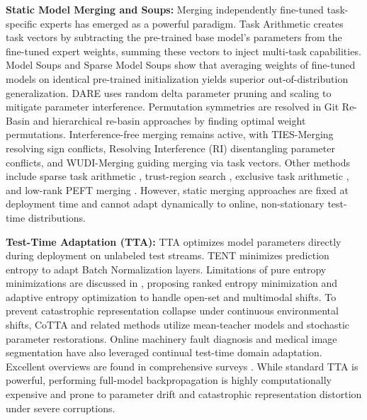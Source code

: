 \documentclass{article}
\theoremstyle{plain}
\theoremstyle{definition}
\theoremstyle{remark}
\begin{document}
\textbf{Static Model Merging and Soups:} Merging independently fine-tuned task-specific experts has emerged as a powerful paradigm. Task Arithmetic \cite{ilharco23} creates task vectors by subtracting the pre-trained base model's parameters from the fine-tuned expert weights, summing these vectors to inject multi-task capabilities. Model Soups \cite{wortsman_soups_2022} and Sparse Model Soups \cite{zimmer_sparse_2023} show that averaging weights of fine-tuned models on identical pre-trained initialization yields superior out-of-distribution generalization. DARE \cite{dare_merging} uses random delta parameter pruning and scaling to mitigate parameter interference. Permutation symmetries are resolved in Git Re-Basin \cite{ainsworth_rebasin_2022} and hierarchical re-basin approaches \cite{franke_robustness_2025} by finding optimal weight permutations. Interference-free merging remains active, with TIES-Merging \cite{yadav_tiesmerging_2023} resolving sign conflicts, Resolving Interference (RI) \cite{ramesh_resolving_2026} disentangling parameter conflicts, and WUDI-Merging \cite{cheng_whoever_2025} guiding merging via task vectors. Other methods include sparse task arithmetic \cite{he_localizeandstitch_2024}, trust-region search \cite{sun_arithmetic_2025}, exclusive task arithmetic \cite{zhou_metagpt_2024}, and low-rank PEFT merging \cite{zhang_loraprune_2023, lu_sparsitypreserved_2024, woo_paca_2025}. However, static merging approaches are fixed at deployment time and cannot adapt dynamically to online, non-stationary test-time distributions.

\textbf{Test-Time Adaptation (TTA):} TTA optimizes model parameters directly during deployment on unlabeled test streams. TENT \cite{wang_tent_2021} minimizes prediction entropy to adapt Batch Normalization layers. Limitations of pure entropy minimizations are discussed in \cite{lee_entropy_2024}, proposing ranked entropy minimization \cite{han_ranked_2025} and adaptive entropy optimization \cite{dong_towards_2025} to handle open-set and multimodal shifts. To prevent catastrophic representation collapse under continuous environmental shifts, CoTTA \cite{wang_continual_2022} and related methods \cite{yang_versatile_2024, wang_continual_2023} utilize mean-teacher models and stochastic parameter restorations. Online machinery fault diagnosis \cite{tian_continual_2025} and medical image segmentation \cite{zhu_improving_2024} have also leveraged continual test-time domain adaptation. Excellent overviews are found in comprehensive surveys \cite{liang_comprehensive_2023}. While standard TTA is powerful, performing full-model backpropagation is highly computationally expensive and prone to parameter drift and catastrophic representation distortion under severe corruptions.
\end{document}
